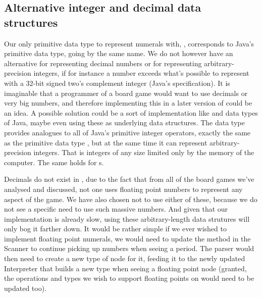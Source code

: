 \subsection{Alternative integer and decimal data structures}
\label{sec:bigintegers}

Our only primitive data type to represent numerals with, ,
corresponds to Java's primitive data type, going by the same name. We
do not however have an alternative for representing decimal numbers
or for representing arbitrary-precision integers, if for instance a
number exceeds what's possible to represent with a $32$-bit signed
two's complement integer (Java's specification). It is imaginable
that a programmer of a board game would want to use decimals or very
big numbers, and therefore implementing this in a later version of
\productname{} could be an idea. A possible solution could be a sort of
implementation like  and  data
types of Java, maybe even using these as underlying data structures.
The  data type provides analogues to all of Java's
primitive integer operators, exactly the same as the primitive data
type  \cite{javabigint}, but at the same time it
can represent arbitrary-precision integers. That is integers of any
size limited only by the memory of the computer. The same holds for
s.

Decimals do not exist in \productname{}, due to the fact that from all
of the board games we've analysed and discussed, not one uses floating
point numbers to represent any aspect of the game. We have also chosen
not to use either of these, because we do not see a specific need to use
such massive numbers. And given that our \productname{} implementation
is already slow, using these arbitrary-length data strutures will
only bog it farther down. It would be rather simple if we ever wished
to implement floating point numerals, we would need to update the
 method in the Scanner to continue picking up numbers
when seeing a period. The parser would then need to create a new type
of node for it, feeding it to the newly updated Interpreter that builds
a new type when seeing a floating point node (granted, the operations
and types we wish to support floating points on would need to be updated
too).
